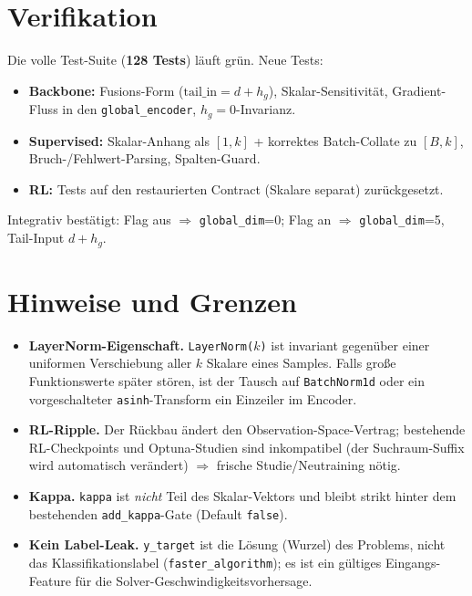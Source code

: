 \documentclass[11pt,a4paper]{article}
\newcommand{\code}[1]{\texttt{#1}}
\begin{document}
\section{Verifikation}

Die volle Test-Suite (\textbf{128 Tests}) läuft grün. Neue Tests:
\begin{itemize}\setlength\itemsep{1pt}
  \item \textbf{Backbone:} Fusions-Form ($\text{tail\_in}=d+h_g$), Skalar-Sensitivität,
        Gradient-Fluss in den \code{global\_encoder}, $h_g{=}0$-Invarianz.
  \item \textbf{Supervised:} Skalar-Anhang als $[1,k]$ + korrektes Batch-Collate zu
        $[B,k]$, Bruch-/Fehlwert-Parsing, Spalten-Guard.
  \item \textbf{RL:} Tests auf den restaurierten Contract (Skalare separat) zurückgesetzt.
\end{itemize}
Integrativ bestätigt: Flag aus $\Rightarrow$ \code{global\_dim}=0; Flag an
$\Rightarrow$ \code{global\_dim}=5, Tail-Input $d+h_g$.

\section{Hinweise und Grenzen}

\begin{itemize}\setlength\itemsep{2pt}
  \item \textbf{LayerNorm-Eigenschaft.} \code{LayerNorm($k$)} ist invariant gegenüber
        einer uniformen Verschiebung aller $k$ Skalare eines Samples. Falls große
        Funktionswerte später stören, ist der Tausch auf \code{BatchNorm1d} oder ein
        vorgeschalteter \code{asinh}-Transform ein Einzeiler im Encoder.
  \item \textbf{RL-Ripple.} Der Rückbau ändert den Observation-Space-Vertrag; bestehende
        RL-Checkpoints und Optuna-Studien sind inkompatibel (der Suchraum-Suffix wird
        automatisch verändert) $\Rightarrow$ frische Studie/Neutraining nötig.
  \item \textbf{Kappa.} \code{kappa} ist \emph{nicht} Teil des Skalar-Vektors und bleibt
        strikt hinter dem bestehenden \code{add\_kappa}-Gate (Default \code{false}).
  \item \textbf{Kein Label-Leak.} \code{y\_target} ist die Lösung (Wurzel) des
        Problems, nicht das Klassifikationslabel (\code{faster\_algorithm}); es ist ein
        gültiges Eingangs-Feature für die Solver-Geschwindigkeitsvorhersage.
\end{itemize}
\end{document}
